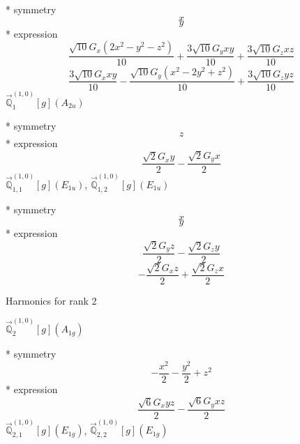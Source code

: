 \documentclass[fleqn,8pt]{jsarticle}
\begin{document}
\noindent\quad ** symmetry
\begin{dmath*}
x
\end{dmath*}
\begin{dmath*}
y
\end{dmath*}
\noindent\quad ** expression
\begin{dmath*}
\frac{\sqrt{10} G_{x} \left(2 x^{2} - y^{2} - z^{2}\right)}{10} + \frac{3 \sqrt{10} G_{y} x y}{10} + \frac{3 \sqrt{10} G_{z} x z}{10}
\end{dmath*}
\begin{dmath*}
\frac{3 \sqrt{10} G_{x} x y}{10} - \frac{\sqrt{10} G_{y} \left(x^{2} - 2 y^{2} + z^{2}\right)}{10} + \frac{3 \sqrt{10} G_{z} y z}{10}
\end{dmath*}
\noindent\quad $\vec{\mathbb{Q}}_{1}^{(1,0)}[g](A_{2u})$

\noindent\quad ** symmetry
\begin{dmath*}
z
\end{dmath*}
\noindent\quad ** expression
\begin{dmath*}
\frac{\sqrt{2} G_{x} y}{2} - \frac{\sqrt{2} G_{y} x}{2}
\end{dmath*}
\noindent\quad $\vec{\mathbb{Q}}_{1,1}^{(1,0)}[g](E_{1u})$, $\vec{\mathbb{Q}}_{1,2}^{(1,0)}[g](E_{1u})$

\noindent\quad ** symmetry
\begin{dmath*}
x
\end{dmath*}
\begin{dmath*}
y
\end{dmath*}
\noindent\quad ** expression
\begin{dmath*}
\frac{\sqrt{2} G_{y} z}{2} - \frac{\sqrt{2} G_{z} y}{2}
\end{dmath*}
\begin{dmath*}
- \frac{\sqrt{2} G_{x} z}{2} + \frac{\sqrt{2} G_{z} x}{2}
\end{dmath*}

\noindent * Harmonics for rank 2

\noindent\quad $\vec{\mathbb{Q}}_{2}^{(1,0)}[g](A_{1g})$

\noindent\quad ** symmetry
\begin{dmath*}
- \frac{x^{2}}{2} - \frac{y^{2}}{2} + z^{2}
\end{dmath*}
\noindent\quad ** expression
\begin{dmath*}
\frac{\sqrt{6} G_{x} y z}{2} - \frac{\sqrt{6} G_{y} x z}{2}
\end{dmath*}
\noindent\quad $\vec{\mathbb{Q}}_{2,1}^{(1,0)}[g](E_{1g})$, $\vec{\mathbb{Q}}_{2,2}^{(1,0)}[g](E_{1g})$
\end{document}
